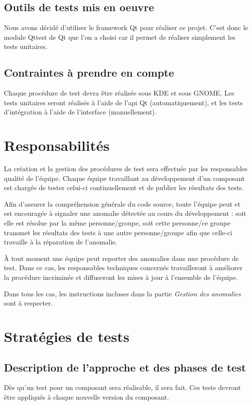 \documentclass{../res/univ-projet}
\begin{document}
\subsection{Outils de tests mis en oeuvre}
Nous avons décidé d'utiliser le framework Qt pour réaliser ce projet. C'est donc le module Qttest de Qt que l'on a choisi car il permet de réaliser simplement les tests unitaires.

\subsection{Contraintes à prendre en compte}
Chaque procédure de test devra être réalisée sous KDE et sous GNOME.
Les tests unitaires seront réalisés à l'aide de l'api Qt (automatiquement), et les tests d'intégration à l'aide de l'interface (manuellement).



\section{Responsabilités}

  La création et la gestion des procédures de test sera effectuée par les responsables qualité de l'équipe. Chaque équipe travaillant au développement d'un composant est chargée de tester celui-ci continuellement et de publier les résultats des tests.
  
  Afin d'assurer la compréhension générale du code source, toute l'équipe peut et est encouragée à signaler une anomalie détectée au cours du développement : soit elle est résolue par la même personne/groupe, soit cette personne/ce groupe transmet les résultats 
  des tests à une autre personne/groupe afin que celle-ci travaille à la réparation de l'anomalie.
  
  À tout moment une équipe peut reporter des anomalies dans une procédure de test. Dans ce cas, les responsables techniques concernés travailleront à améliorer la procédure incriminée et diffuseront les mises à jour à l'ensemble de l'équipe.

  Dans tous les cas, les instructions incluses dans la partie \emph{Gestion des anomalies} sont à respecter.


\section{Stratégies de tests}

\subsection{Description de l'approche et des phases de test}
Dès qu'un test pour un composant sera réalisable, il sera fait. Ces tests devront être appliqués à chaque nouvelle version du composant.
\end{document}

